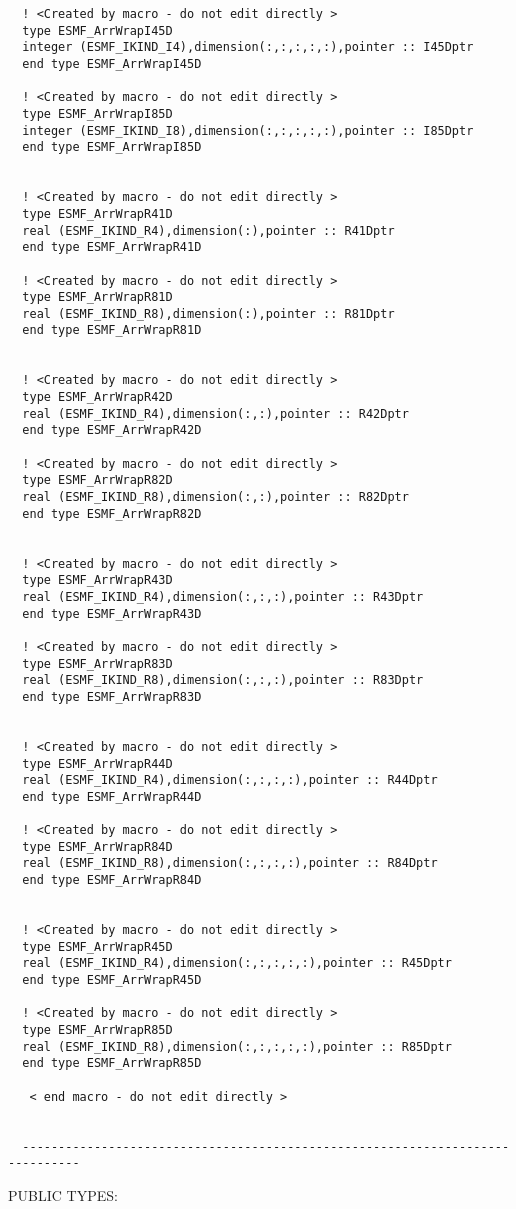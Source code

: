 \begin{verbatim}
  ! <Created by macro - do not edit directly > 
  type ESMF_ArrWrapI45D 
  integer (ESMF_IKIND_I4),dimension(:,:,:,:,:),pointer :: I45Dptr 
  end type ESMF_ArrWrapI45D 
  
  ! <Created by macro - do not edit directly > 
  type ESMF_ArrWrapI85D 
  integer (ESMF_IKIND_I8),dimension(:,:,:,:,:),pointer :: I85Dptr 
  end type ESMF_ArrWrapI85D 
  
  
  ! <Created by macro - do not edit directly > 
  type ESMF_ArrWrapR41D 
  real (ESMF_IKIND_R4),dimension(:),pointer :: R41Dptr 
  end type ESMF_ArrWrapR41D 
  
  ! <Created by macro - do not edit directly > 
  type ESMF_ArrWrapR81D 
  real (ESMF_IKIND_R8),dimension(:),pointer :: R81Dptr 
  end type ESMF_ArrWrapR81D 
  
  
  ! <Created by macro - do not edit directly > 
  type ESMF_ArrWrapR42D 
  real (ESMF_IKIND_R4),dimension(:,:),pointer :: R42Dptr 
  end type ESMF_ArrWrapR42D 
  
  ! <Created by macro - do not edit directly > 
  type ESMF_ArrWrapR82D 
  real (ESMF_IKIND_R8),dimension(:,:),pointer :: R82Dptr 
  end type ESMF_ArrWrapR82D 
  
  
  ! <Created by macro - do not edit directly > 
  type ESMF_ArrWrapR43D 
  real (ESMF_IKIND_R4),dimension(:,:,:),pointer :: R43Dptr 
  end type ESMF_ArrWrapR43D 
  
  ! <Created by macro - do not edit directly > 
  type ESMF_ArrWrapR83D 
  real (ESMF_IKIND_R8),dimension(:,:,:),pointer :: R83Dptr 
  end type ESMF_ArrWrapR83D 
  
  
  ! <Created by macro - do not edit directly > 
  type ESMF_ArrWrapR44D 
  real (ESMF_IKIND_R4),dimension(:,:,:,:),pointer :: R44Dptr 
  end type ESMF_ArrWrapR44D 
  
  ! <Created by macro - do not edit directly > 
  type ESMF_ArrWrapR84D 
  real (ESMF_IKIND_R8),dimension(:,:,:,:),pointer :: R84Dptr 
  end type ESMF_ArrWrapR84D 
  
  
  ! <Created by macro - do not edit directly > 
  type ESMF_ArrWrapR45D 
  real (ESMF_IKIND_R4),dimension(:,:,:,:,:),pointer :: R45Dptr 
  end type ESMF_ArrWrapR45D 
  
  ! <Created by macro - do not edit directly > 
  type ESMF_ArrWrapR85D 
  real (ESMF_IKIND_R8),dimension(:,:,:,:,:),pointer :: R85Dptr 
  end type ESMF_ArrWrapR85D 
  
   < end macro - do not edit directly > 
  
 
  ------------------------------------------------------------------------------\end{verbatim}{\sf PUBLIC TYPES:}
